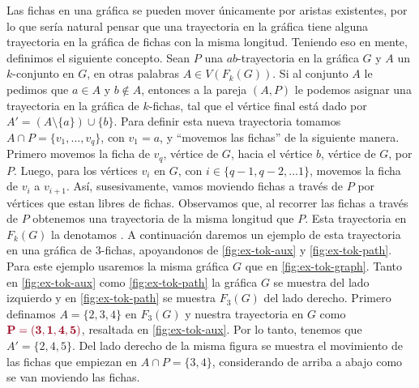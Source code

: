 Las fichas en una gr\'afica se pueden mover \'unicamente por aristas existentes,
por lo que ser\'ia natural pensar que una trayectoria en la gr\'afica tiene
alguna trayectoria en la gr\'afica de fichas con la misma longitud. Teniendo eso
en mente, definimos el siguiente concepto. Sean $P$ una $ab$-trayectoria en la
gr\'afica $G$ y $A$ un $k$-conjunto en $G$, en otras palabras $A \in V(F_k(G))$.
Si al conjunto $A$ le pedimos que $a\in A$ y $b \notin A$, entonces a la pareja
$(A,P)$ le podemos asignar una trayectoria en la gr\'afica de $k$-fichas, tal
que el v\'ertice final est\'a dado por $A'=(A \setminus \{a\}) \cup \{b\}$. Para
definir esta nueva trayectoria tomamos $A\cap P =\{v_1, \dots, v_q\}$, con $v_1
= a$, y ``movemos las fichas'' de la siguiente manera. Primero movemos la ficha
de $v_q$, v\'ertice de $G$, hacia el v\'ertice $b$, v\'ertice de $G$, por $P$.
Luego, para los v\'ertices $v_i$ en $G$, con $i \in \{q-1, q-2, \dots 1\}$,
movemos la ficha de $v_i$ a $v_{i+1}$. As\'i, susesivamente, vamos moviendo
fichas a trav\'es de $P$ por v\'ertices que estan libres de fichas. Observamos
que, al recorrer las fichas a trav\'es de $P$ obtenemos una trayectoria de la
misma longitud que $P$. Esta trayectoria en $F_k(G)$ la denotamos
. A continuaci\'on daremos un
ejemplo de esta trayectoria en una gr\'afica de $3$-fichas, apoyandonos de
\cref{fig:ex-tok-aux} y \cref{fig:ex-tok-path}. Para este ejemplo usaremos la
misma gr\'afica $G$ que en \cref{fig:ex-tok-graph}. Tanto en
\cref{fig:ex-tok-aux} como \cref{fig:ex-tok-path} la gr\'afica $G$ se muestra
del lado izquierdo y en \cref{fig:ex-tok-path} se muestra $F_3(G)$ del lado
derecho. Primero definamos $A=\{2,3,4\}$ en $F_3(G)$ y nuestra trayectoria en
$G$ como ${\color{vino}\bf P= (3,1,4,5)}$, resaltada en \cref{fig:ex-tok-aux}.
Por lo tanto, tenemos que $A'=\{2,4,5\}$. Del lado derecho de la misma figura se
muestra el movimiento de las fichas que empiezan en $A \cap P =\{3,4\}$,
considerando de arriba a abajo como se van moviendo las fichas.

